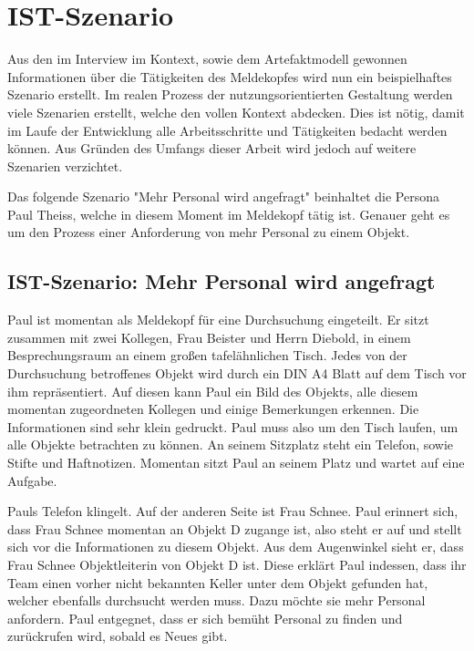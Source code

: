 \section{IST-Szenario}\label{sec:istSzenario}

Aus den im Interview im Kontext, sowie dem Artefaktmodell gewonnen Informationen über die Tätigkeiten des Meldekopfes wird nun ein beispielhaftes Szenario erstellt.
Im realen Prozess der nutzungsorientierten Gestaltung werden viele Szenarien erstellt, welche den vollen Kontext abdecken.
Dies ist nötig, damit im Laufe der Entwicklung alle Arbeitsschritte und Tätigkeiten bedacht werden können.
Aus Gründen des Umfangs dieser Arbeit wird jedoch auf weitere Szenarien verzichtet.

Das folgende Szenario "Mehr Personal wird angefragt" beinhaltet die Persona Paul Theiss, welche in diesem Moment im Meldekopf tätig ist.
Genauer geht es um den Prozess einer Anforderung von mehr Personal zu einem Objekt.

\subsection{IST-Szenario: Mehr Personal wird angefragt}

Paul ist momentan als Meldekopf für eine Durchsuchung eingeteilt. 
Er sitzt zusammen mit zwei Kollegen, Frau Beister und Herrn Diebold, in einem Besprechungsraum an einem großen tafelähnlichen Tisch. 
Jedes von der Durchsuchung betroffenes Objekt wird durch ein DIN A4 Blatt auf dem Tisch vor ihm repräsentiert. 
Auf diesen kann Paul ein Bild des Objekts, alle diesem momentan zugeordneten Kollegen und einige Bemerkungen erkennen. 
Die Informationen sind sehr klein gedruckt. 
Paul muss also um den Tisch laufen, um alle Objekte betrachten zu können. 
An seinem Sitzplatz steht ein Telefon, sowie Stifte und Haftnotizen. 
Momentan sitzt Paul an seinem Platz und wartet auf eine Aufgabe.

Pauls Telefon klingelt. 
Auf der anderen Seite ist Frau Schnee.
Paul erinnert sich, dass Frau Schnee momentan an Objekt D zugange ist, also steht er auf und stellt sich vor die Informationen zu diesem Objekt. 
Aus dem Augenwinkel sieht er, dass Frau Schnee Objektleiterin von Objekt D ist. 
Diese erklärt Paul indessen, dass ihr Team einen vorher nicht bekannten Keller unter dem Objekt gefunden hat, welcher ebenfalls durchsucht werden muss. 
Dazu möchte sie mehr Personal anfordern. Paul entgegnet, dass er sich bemüht Personal zu finden und zurückrufen wird, sobald es Neues gibt.

